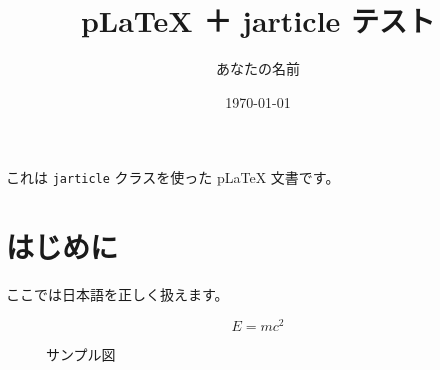 \documentclass[dvipdfmx]{jarticle}
\title{pLaTeX ＋ jarticle テスト}
\author{あなたの名前}
\date{\today}
\begin{document}
\maketitle

これは \texttt{jarticle} クラスを使った pLaTeX 文書です。

\section{はじめに}

ここでは日本語を正しく扱えます。

\begin{equation}
    E = mc^2
\end{equation}

\begin{figure}[H]
    \centering
    \caption{サンプル図}
    \label{fig:sample}
\end{figure}



\end{document}
